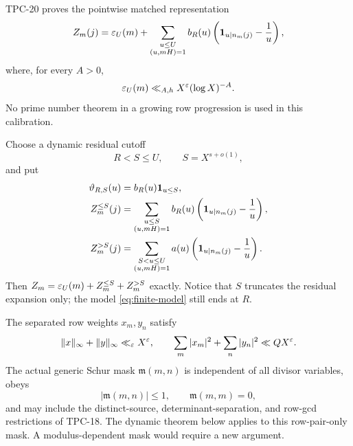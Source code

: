 TPC-20 proves the pointwise matched representation
\begin{equation}
 Z_m(j)=\varepsilon_U(m)+
 \sum_{\substack{u\le U\\(u,mH)=1}}
 b_R(u)\left(\mathbf 1_{u\mid n_m(j)}-\frac1u\right),
 \label{eq:matched-signal}
\end{equation}
where, for every \(A>0\),
\begin{equation}
 \varepsilon_U(m)\ll_{A,h}X^\varepsilon(\log X)^{-A}.
 \label{eq:calibration-defect}
\end{equation}
No prime number theorem in a growing row progression is used in this
calibration.

Choose a dynamic residual cutoff
\begin{equation}
 R<S\le U,
 \qquad S=X^{s+o(1)},
 \label{eq:S}
\end{equation}
and put
\begin{align}
 \vartheta_{R,S}(u)&=b_R(u)\mathbf 1_{u\le S},
 \label{eq:theta-RS}\\
 Z_m^{\le S}(j)
 &=\sum_{\substack{u\le S\\(u,mH)=1}}
 b_R(u)\left(\mathbf 1_{u\mid n_m(j)}-\frac1u\right),
 \label{eq:truncated-signal}\\
 Z_m^{>S}(j)
 &=\sum_{\substack{S<u\le U\\(u,mH)=1}}
 a(u)\left(\mathbf 1_{u\mid n_m(j)}-\frac1u\right).
 \label{eq:ultra-signal}
\end{align}
Then \(Z_m=\varepsilon_U(m)+Z_m^{\le S}+Z_m^{>S}\) exactly.  Notice that
\(S\) truncates the residual expansion only; the model
\eqref{eq:finite-model} still ends at \(R\).

The separated row weights \(x_m,y_n\) satisfy
\begin{equation}
 \|x\|_\infty+\|y\|_\infty\ll_\varepsilon X^\varepsilon,
 \qquad
 \sum_m|x_m|^2+\sum_n|y_n|^2\ll QX^\varepsilon.
 \label{eq:row-energy}
\end{equation}
The actual generic Schur mask \(\mathfrak m(m,n)\) is independent of
all divisor variables, obeys
\begin{equation}
 |\mathfrak m(m,n)|\le1,
 \qquad \mathfrak m(m,m)=0,
 \label{eq:mask}
\end{equation}
and may include the distinct-source, determinant-separation, and
row-gcd restrictions of TPC-18.  The dynamic theorem below applies to
this row-pair-only mask.  A modulus-dependent mask would require a new
argument.

